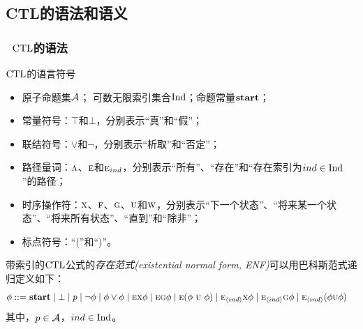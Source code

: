 \documentclass[9pt, CJK]{beamer}
\begin{document}
\subsection{CTL的语法和语义}
\begin{frame} 
	\frametitle{~$\textrm{CTL}$的语法}
	{\footnotesize 
			\begin{block}{$\textrm{CTL}$的语言符号}
			\begin{itemize}
				\item 原子命题集${\cal A}$； \quad 可数无限索引集合$\textrm{Ind}$；\quad 命题常量$\textbf{start}$；
				\item 常量符号：$\top$和$\bot$，分别表示“真”和“假”；
				\item 联结符号：$\vee$和$\neg$，分别表示“析取”和“否定”；
				\item 路径量词：$\textsc{a}$、$\textsc{e}$和$\textsc{e}_{ind}$，分别表示“所有”、“存在”和“存在索引为$ind\in \textrm{Ind}$”的路径；
				\item 时序操作符：$\textsc{x}$、$\textsc{f}$、$\textsc{g}$、$\textsc{u}$和$\textsc{w}$，分别表示“下一个状态”、“将来某一个状态”、“将来所有状态”、“直到”和“除非”；
				\item 标点符号：“(”和“)”。
			\end{itemize}
		\end{block}
		\begin{definition}
			带索引的$\textrm{CTL}$公式的\emph{存在范式(existential normal form, ENF)}可以用巴科斯范式递归定义如下：
			\begin{align*}
				\phi  ::= & \ \start\mid \bot %
				\mid p \mid\neg\phi \mid \phi\lor\phi \mid
				\EXIST \NEXT \phi \mid
				\EXIST \GLOBAL \phi \mid 
				\EXIST (\phi\ \UNTILL\ \phi)\mid 
				\EXIST_{\tuple{ind}}\NEXT \phi  \mid 
				\EXIST_{\tuple{ind}}\GLOBAL \phi \mid
				\EXIST_{\tuple{ind}}(\phi \UNTILL \phi)  
			\end{align*}
		其中，$p\in {\cal A}$，$ind \in \textrm{Ind}$。
		

\end{definition}}
\end{frame}
\end{document}
